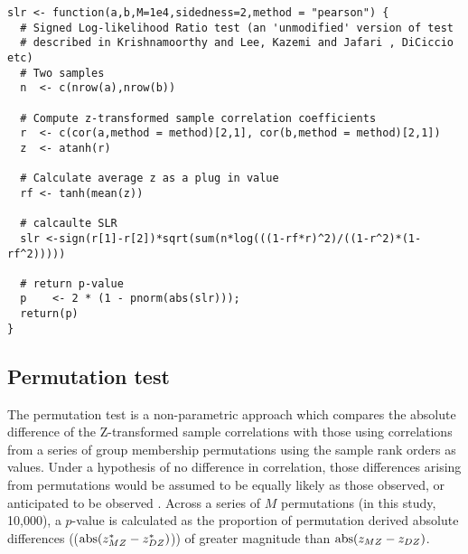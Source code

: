 \begin{lstlisting}[caption={Signed log-likelihood ratio test}]
slr <- function(a,b,M=1e4,sidedness=2,method = "pearson") {
  # Signed Log-likelihood Ratio test (an 'unmodified' version of test 
  # described in Krishnamoorthy and Lee, Kazemi and Jafari , DiCiccio etc)
  # Two samples
  n  <- c(nrow(a),nrow(b))
  
  # Compute z-transformed sample correlation coefficients
  r  <- c(cor(a,method = method)[2,1], cor(b,method = method)[2,1])
  z  <- atanh(r)
  
  # Calculate average z as a plug in value
  rf <- tanh(mean(z))
  
  # calcaulte SLR
  slr <-sign(r[1]-r[2])*sqrt(sum(n*log(((1-rf*r)^2)/((1-r^2)*(1-rf^2)))))
  
  # return p-value
  p    <- 2 * (1 - pnorm(abs(slr))); 
  return(p)
}
\end{lstlisting}

\subsection{Permutation test}
The permutation test is a non-parametric approach which compares the absolute 
difference of the Z-transformed sample correlations with those using correlations 
from a series of group membership permutations using the sample rank orders as 
values.  Under a hypothesis of no difference in correlation, those differences arising from permutations would be assumed to be equally likely as those observed, or anticipated to be observed \cite{Efron1993}.  Across a series of $M$ permutations (in this study, 10,000), a $p$-value is calculated as the proportion of permutation derived absolute differences (($\operatorname{abs}(z_{MZ}^* - z_{DZ}^*)$)) of greater magnitude than $\operatorname{abs}(z_{MZ} - z_{DZ})$.

